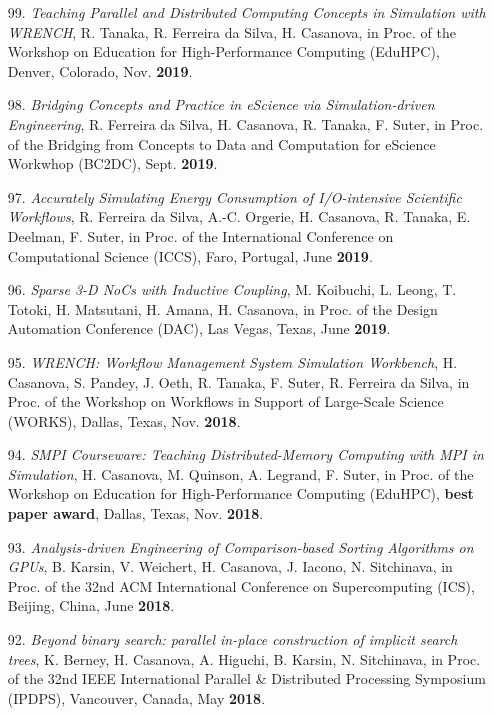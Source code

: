\begin{enumerate}

\item [99.] {\it Teaching Parallel and Distributed Computing Concepts in
Simulation with WRENCH}, R. Tanaka, R. Ferreira da Silva, H. Casanova, in
Proc. of the Workshop on Education for High-Performance Computing (EduHPC),
Denver, Colorado, Nov. {\bf 2019}.


\item [98.] {\it Bridging Concepts and Practice in eScience via
      Simulation-driven Engineering},
    R. Ferreira da Silva, H. Casanova, R. Tanaka, F. Suter,
	in Proc. of the Bridging from Concepts to Data and Computation for
	eScience Workwhop (BC2DC), Sept. {\bf 2019}.

\item [97.] {\it Accurately Simulating Energy Consumption of I/O-intensive Scientific Workflows}, R. Ferreira da Silva, A.-C. Orgerie, H. Casanova, R. Tanaka, E. Deelman, F. Suter, in Proc. of the International Conference on Computational Science (ICCS), Faro, Portugal, June {\bf 2019}.

\item [96.] {\it Sparse 3-D NoCs with Inductive Coupling}, M. Koibuchi, L. Leong, T. Totoki, H. Matsutani, H. Amana, H. Casanova, in Proc. of the Design Automation Conference (DAC), Las Vegas, Texas, June {\bf 2019}.

\item [95.] {\it WRENCH: Workflow Management System Simulation Workbench}, H. Casanova, S. Pandey, J. Oeth, R. Tanaka, F. Suter, R. Ferreira da Silva, in Proc. of the Workshop on Workflows in Support of Large-Scale Science (WORKS), Dallas, Texas, Nov. {\bf 2018}.

\item [94.] {\it SMPI Courseware: Teaching Distributed-Memory Computing with MPI in Simulation}, H. Casanova, M. Quinson, A. Legrand, F. Suter, in Proc. of the Workshop on Education for High-Performance Computing (EduHPC), {\bf best paper award}, Dallas, Texas, Nov. {\bf 2018}.

\item [93.] {\it Analysis-driven Engineering of Comparison-based Sorting
    Algorithms on GPUs},
    B. Karsin, V. Weichert, H. Casanova, J. Iacono, N. Sitchinava, 
in Proc. of the 32nd ACM International Conference on Supercomputing
(ICS), Beijing, China, June {\bf 2018}.

\item [92.] {\it Beyond binary search: parallel in-place construction of implicit search trees},
K. Berney, H. Casanova, A. Higuchi, B. Karsin, N. Sitchinava,
in Proc. of the 32nd IEEE International Parallel \& Distributed Processing Symposium (IPDPS), Vancouver, Canada, May {\bf 2018}.



\end{enumerate}
